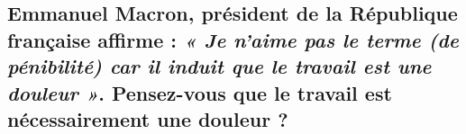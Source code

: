 \newpage \begin{center}
	\subsection*{Emmanuel Macron, président de la République française affirme : \textit{« Je n’aime pas le terme (de pénibilité) car il induit que le travail est une douleur »}. Pensez-vous que le travail est nécessairement une douleur ? }
\end{center}

